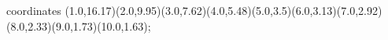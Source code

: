 					coordinates { (1.0,16.17)(2.0,9.95)(3.0,7.62)(4.0,5.48)(5.0,3.5)(6.0,3.13)(7.0,2.92)(8.0,2.33)(9.0,1.73)(10.0,1.63)};